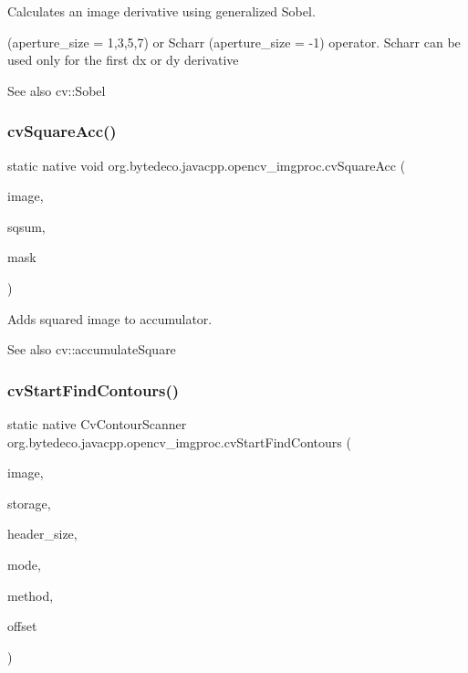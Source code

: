 Calculates an image derivative using generalized Sobel. 

(aperture\+\_\+size = 1,3,5,7) or Scharr (aperture\+\_\+size = -\/1) operator. Scharr can be used only for the first dx or dy derivative \begin{DoxySeeAlso}{See also}
cv\+::\+Sobel 
\end{DoxySeeAlso}
\mbox{\label{group__imgproc__c_ga8c1d632da04d1ddc6e38b712f03adbe8}} 
\subsubsection{\texorpdfstring{cv\+Square\+Acc()}{cvSquareAcc()}}
{\footnotesize\ttfamily static native void org.\+bytedeco.\+javacpp.\+opencv\+\_\+imgproc.\+cv\+Square\+Acc (\begin{DoxyParamCaption}\item[{@Const Cv\+Arr}]{image,  }\item[{Cv\+Arr}]{sqsum,  }\item[{@Const Cv\+Arr}]{mask }\end{DoxyParamCaption})\hspace{0.3cm}{\ttfamily [static]}}



Adds squared image to accumulator. 

\begin{DoxySeeAlso}{See also}
cv\+::accumulate\+Square 
\end{DoxySeeAlso}
\mbox{\label{group__imgproc__c_ga17ceae2468b1b23ece917fb982a377ff}} 
\subsubsection{\texorpdfstring{cv\+Start\+Find\+Contours()}{cvStartFindContours()}}
{\footnotesize\ttfamily static native Cv\+Contour\+Scanner org.\+bytedeco.\+javacpp.\+opencv\+\_\+imgproc.\+cv\+Start\+Find\+Contours (\begin{DoxyParamCaption}\item[{Cv\+Arr}]{image,  }\item[{Cv\+Mem\+Storage}]{storage,  }\item[{int}]{header\+\_\+size,  }\item[{int}]{mode,  }\item[{int}]{method,  }\item[{@By\+Val(null\+Value=\char`\"{}Cv\+Point(cv\+Point(0,0))\char`\"{}) Cv\+Point}]{offset }\end{DoxyParamCaption})\hspace{0.3cm}{\ttfamily [static]}}



